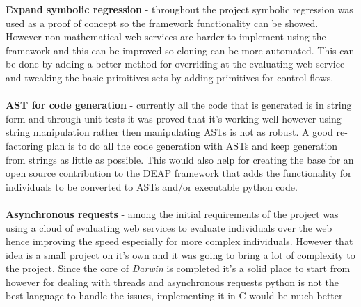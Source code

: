 \textbf{Expand symbolic regression} - throughout the project symbolic regression was 
used as a proof of concept so the framework functionality can be showed. However non mathematical
web services are harder to implement using the framework and this can be improved so cloning can be
more automated. This can be done by adding a better method for overriding at the evaluating web service
and tweaking the basic primitives sets by adding primitives for control flows.
\paragraph{}
\textbf{AST for code generation} - currently all the code that is generated is in string form and through
unit tests it was proved that it's working well however using string manipulation rather then manipulating ASTs
is not as robust. A good re-factoring plan is to do all the code generation with ASTs and keep generation from
strings as little as possible. This would also help for creating the base for an open source contribution to
the DEAP framework that adds the functionality for individuals to be converted to ASTs and/or executable python code.
\paragraph{}
\textbf{Asynchronous requests} - among the initial requirements of the project was using a cloud of evaluating
web services to evaluate individuals over the web hence improving the speed especially for more complex
individuals. However that idea is a small project on it's own and it was going to bring a lot of complexity to the project.
Since the core of \textit{Darwin} is completed it's a solid place to start from however for dealing with threads
and asynchronous requests python is not the best language to handle the issues, implementing it in C would be much better